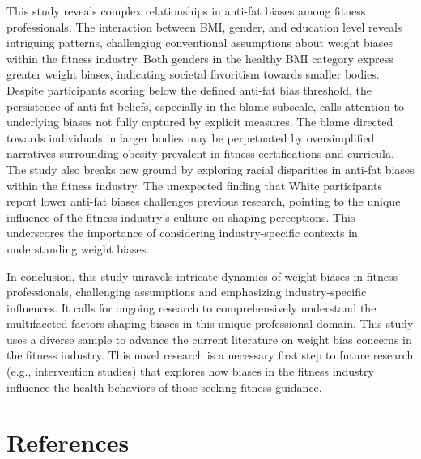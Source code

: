 \documentclass[
  jou,
  longtable,
  nolmodern,
  notxfonts,
  notimes,
  colorlinks=true,linkcolor=blue,citecolor=blue,urlcolor=blue]{apa7}
\begin{document}
This study reveals complex relationships in anti-fat biases among
fitness professionals. The interaction between BMI, gender, and
education level reveals intriguing patterns, challenging conventional
assumptions about weight biases within the fitness industry. Both
genders in the healthy BMI category express greater weight biases,
indicating societal favoritism towards smaller bodies. Despite
participants scoring below the defined anti-fat bias threshold, the
persistence of anti-fat beliefs, especially in the blame subscale, calls
attention to underlying biases not fully captured by explicit measures.
The blame directed towards individuals in larger bodies may be
perpetuated by oversimplified narratives surrounding obesity prevalent
in fitness certifications and curricula. The study also breaks new
ground by exploring racial disparities in anti-fat biases within the
fitness industry. The unexpected finding that White participants report
lower anti-fat biases challenges previous research, pointing to the
unique influence of the fitness industry's culture on shaping
perceptions. This underscores the importance of considering
industry-specific contexts in understanding weight biases.

In conclusion, this study unravels intricate dynamics of weight biases
in fitness professionals, challenging assumptions and emphasizing
industry-specific influences. It calls for ongoing research to
comprehensively understand the multifaceted factors shaping biases in
this unique professional domain. This study uses a diverse sample to
advance the current literature on weight bias concerns in the fitness
industry. This novel research is a necessary first step to future
research (e.g., intervention studies) that explores how biases in the
fitness industry influence the health behaviors of those seeking fitness
guidance.

\section{References}\label{references}
\end{document}
